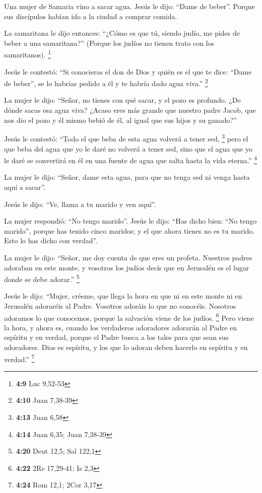 \begin{paracol}{2}
 Una mujer de Samaria vino a sacar agua. Jesús le dijo:
``Dame de beber''.  Porque sus discípulos habían ido a la
ciudad a comprar comida.

 La samaritana le dijo entonces: ``¿Cómo es que tú, siendo
judío, me pides de beber a una samaritana?'' (Porque los judíos no
tienen trato con los samaritanos). \footnote{\textbf{4:9} Luc 9,52-53}

 Jesús le contestó: ``Si conocieras el don de Dios y
quién es el que te dice: ``Dame de beber'', se lo habrías pedido a él y
te habría dado agua viva.'' \footnote{\textbf{4:10} Juan 7,38-39}

 La mujer le dijo: ``Señor, no tienes con qué sacar, y el
pozo es profundo. ¿De dónde sacas esa agua viva?  ¿Acaso
eres más grande que nuestro padre Jacob, que nos dio el pozo y él mismo
bebió de él, al igual que sus hijos y su ganado?''

 Jesús le contestó: ``Todo el que beba de esta agua
volverá a tener sed, \footnote{\textbf{4:13} Juan 6,58} 
pero el que beba del agua que yo le daré no volverá a tener sed, sino
que el agua que yo le daré se convertirá en él en una fuente de agua que
salta hasta la vida eterna.'' \footnote{\textbf{4:14} Juan 6,35; Juan
  7,38-39}

 La mujer le dijo: ``Señor, dame esta agua, para que no
tenga sed ni venga hasta aquí a sacar''.

 Jesús le dijo: ``Ve, llama a tu marido y ven aquí''.

 La mujer respondió: ``No tengo marido''. Jesús le dijo:
``Has dicho bien: ``No tengo marido'',  porque has tenido
cinco maridos; y el que ahora tienes no es tu marido. Esto lo has dicho
con verdad''.

 La mujer le dijo: ``Señor, me doy cuenta de que eres un
profeta.  Nuestros padres adoraban en este monte, y
vosotros los judíos decís que en Jerusalén es el lugar donde se debe
adorar.'' \footnote{\textbf{4:20} Deut 12,5; Sal 122,1}

 Jesús le dijo: ``Mujer, créeme, que llega la hora en que
ni en este monte ni en Jerusalén adoraréis al Padre. 
Vosotros adoráis lo que no conocéis. Nosotros adoramos lo que conocemos,
porque la salvación viene de los judíos. \footnote{\textbf{4:22} 2Re
  17,29-41; Is 2,3}  Pero viene la hora, y ahora es,
cuando los verdaderos adoradores adorarán al Padre en espíritu y en
verdad, porque el Padre busca a los tales para que sean sus adoradores.
 Dios es espíritu, y los que lo adoran deben hacerlo en
espíritu y en verdad.'' \footnote{\textbf{4:24} Rom 12,1; 2Cor 3,17}


\end{paracol}
